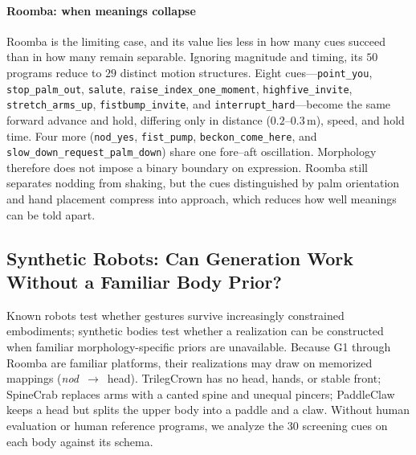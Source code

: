 \paragraph{Roomba: when meanings collapse}
Roomba is the limiting case, and its value lies less in how many cues succeed than in how many remain separable. Ignoring magnitude and timing, its $50$ programs reduce to $29$ distinct motion structures. Eight cues---\texttt{point\_you}, \texttt{stop\_palm\_out}, \texttt{salute}, \texttt{raise\_index\_one\_moment}, \texttt{highfive\_invite}, \texttt{stretch\_arms\_up}, \texttt{fistbump\_invite}, and \texttt{interrupt\_hard}---become the same forward advance and hold, differing only in distance ($0.2$--$0.3$\,m), speed, and hold time. Four more (\texttt{nod\_yes}, \texttt{fist\_pump}, \texttt{beckon\_come\_here}, and \texttt{slow\_down\_request\_palm\_down}) share one fore--aft oscillation. Morphology therefore does not impose a binary boundary on expression. Roomba still separates nodding from shaking, but the cues distinguished by palm orientation and hand placement compress into approach, which reduces how well meanings can be told apart.

\subsection{Synthetic Robots: Can Generation Work Without a Familiar Body Prior?}
\label{sec:results-synthetic}
Known robots test whether gestures survive increasingly constrained embodiments; synthetic bodies test whether a realization can be constructed when familiar morphology-specific priors are unavailable. Because G1 through Roomba are familiar platforms, their realizations may draw on memorized mappings (\emph{nod}~$\rightarrow$~head). TrilegCrown has no head, hands, or stable front; SpineCrab replaces arms with a canted spine and unequal pincers; PaddleClaw keeps a head but splits the upper body into a paddle and a claw. Without human evaluation or human reference programs, we analyze the 30 screening cues on each body against its schema.


